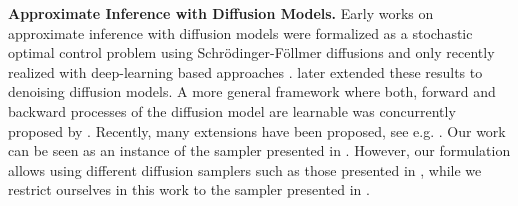 \textbf{Approximate Inference with Diffusion Models.} Early works on approximate inference with diffusion models were formalized as a stochastic optimal control problem using Schr\"odinger-F\"ollmer diffusions \cite{dai1991stochastic,tzen2019theoretical,huang2021schrodinger} and only recently realized with deep-learning based approaches \cite{vargas2023bayesian,zhang2021path}. \citet{vargasdenoising,berneroptimal} later extended these results to denoising diffusion models. A more general framework where both, forward and backward processes of the diffusion model are learnable was concurrently proposed by \citet{richterimproved,nusken2024transport}. 
Recently, many extensions have been proposed, see e.g. \cite{akhound2024iterated,noble2024learned,geffner2023langevin,zhang2023diffusion,chen2024sequential}. Our work can be seen as an instance of the sampler presented in \cite{berneroptimal}. However, our formulation allows using different diffusion samplers such as those presented in \cite{richterimproved}, while we restrict ourselves in this work to the sampler presented in \cite{berneroptimal}.
